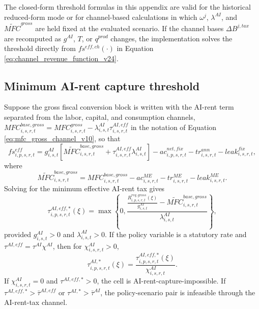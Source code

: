 \documentclass[11pt,a4paper]{article}
\begin{document}
The closed-form threshold formulas in this appendix are valid for the historical reduced-form mode or for channel-based calculations in which $\omega^j$, $\lambda^{AI}$, and $\widetilde{MFC}^{gross}$ are held fixed at the evaluated scenario. If the channel bases $\Delta B^{j,tax}$ are recomputed as $g^{AI}$, $T$, or $q^{prod}$ changes, the implementation solves the threshold directly from $fs^{eff,ch}(\cdot)$ in Equation \eqref{eq:channel_revenue_function_v24}.

\subsection{Minimum AI-rent capture threshold}

Suppose the gross fiscal conversion block is written with the AI-rent term separated from the labor, capital, and consumption channels, $MFC^{base,gross}_{i,s,r,t}=MFC^{gross}_{i,s,r,t}-\lambda^{AI}_{i,s,t}\tau^{AI,eff}_{i,s,r,t}$ in the notation of Equation \eqref{eq:mfc_gross_channel_v10}, so that
\begin{equation}
    fs^{eff}_{i,p,s,r,t}=g^{AI}_{i,s,t}\left[\widetilde{MFC}^{base,gross}_{i,s,r,t}+\tau^{AI,eff}_{i,s,r,t}\lambda^{AI}_{i,s,t}\right]-ac^{net,fix}_{i,p,s,r,t}-tr^{ann}_{i,s,r,t}-leak^{fix}_{i,s,r,t},
\end{equation}
where
\begin{equation}
    \widetilde{MFC}^{base,gross}_{i,s,r,t}=MFC^{base,gross}_{i,s,r,t}-ac^{ME}_{i,s,r,t}-tr^{ME}_{i,s,r,t}-leak^{ME}_{i,s,r,t}.
\end{equation}
Solving for the minimum effective AI-rent tax gives
\begin{equation}\label{eq:tau_ai_eff_star_v10}
    \tau^{AI,eff,*}_{i,p,s,r,t}(\xi)=
    \max\left\{0,
    \frac{\frac{R^{req,gross}_{i,p,s,r,t}(\xi)}{g^{AI}_{i,s,t}}-\widetilde{MFC}^{base,gross}_{i,s,r,t}}
    {\lambda^{AI}_{i,s,t}}
    \right\},
\end{equation}
provided $g^{AI}_{i,s,t}>0$ and $\lambda^{AI}_{i,s,t}>0$. If the policy variable is a statutory rate and $\tau^{AI,eff}=\tau^{AI}\chi^{AI}$, then for $\chi^{AI}_{i,s,r,t}>0$,
\begin{equation}\label{eq:tau_ai_stat_star_v10}
    \tau^{AI,*}_{i,p,s,r,t}(\xi)=\frac{\tau^{AI,eff,*}_{i,p,s,r,t}(\xi)}{\chi^{AI}_{i,s,r,t}}.
\end{equation}
If $\chi^{AI}_{i,s,r,t}=0$ and $\tau^{AI,eff,*}>0$, the cell is AI-rent-capture-impossible. If $\tau^{AI,eff,*}>\bar\tau^{AI,eff}$ or $\tau^{AI,*}>\bar\tau^{AI}$, the policy-scenario pair is infeasible through the AI-rent-tax channel.
\end{document}
